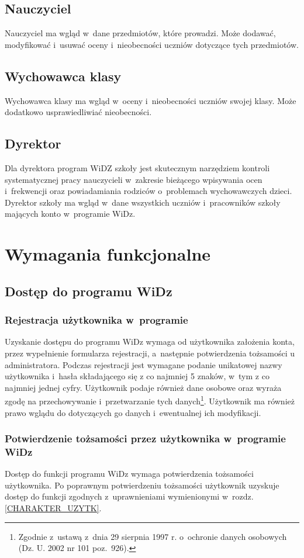 \documentclass[12pt,leqno,twoside]{mwart}
\begin{document}
\subsection{Nauczyciel}
\noindent Nauczyciel ma wgląd w~dane przedmiotów, które prowadzi. Może dodawać, modyfikować i~usuwać oceny i~nieobecności uczniów dotyczące tych przedmiotów.

\subsection{Wychowawca klasy}
\noindent Wychowawca klasy ma wgląd w~oceny i~nieobecności uczniów swojej klasy. Może dodatkowo usprawiedliwiać nieobecności.

\subsection{Dyrektor}
\noindent Dla dyrektora program WiDZ szkoły jest skutecznym narzędziem kontroli systematycznej pracy nauczycieli w~zakresie bieżącego wpisywania ocen i~frekwencji oraz powiadamiania rodziców o~problemach wychowawczych dzieci. Dyrektor szkoły ma wgląd w~dane wszystkich uczniów i~pracowników szkoły mających konto w~programie WiDz.

\section{Wymagania funkcjonalne}
\subsection{Dostęp do programu WiDz}
\subsubsection{Rejestracja użytkownika w~programie}
\noindent Uzyskanie dostępu do programu WiDz wymaga od użytkownika założenia konta, przez wypełnienie formularza rejestracji, a~następnie potwierdzenia tożsamości u administratora. Podczas rejestracji jest wymagane podanie unikatowej nazwy użytkownika i~hasła składającego się z co najmniej 5 znaków, w~tym z co najmniej jednej cyfry. Użytkownik podaje również dane osobowe oraz wyraża zgodę na przechowywanie i~przetwarzanie tych danych\footnote{Zgodnie z~ustawą z~dnia 29 sierpnia 1997 r. o~ochronie danych osobowych (Dz. U. 2002 nr 101 poz.~926).}. Użytkownik ma również prawo wglądu do dotyczących go danych i~ewentualnej ich modyfikacji.

\subsubsection{Potwierdzenie tożsamości przez użytkownika w~programie WiDz}
\noindent Dostęp do funkcji programu WiDz wymaga potwierdzenia tożsamości użytkownika. Po poprawnym potwierdzeniu tożsamości użytkownik uzyskuje dostęp do funkcji zgodnych z~uprawnieniami wymienionymi w~rozdz. \ref{CHARAKTER_UZYTK}. 
\end{document}
